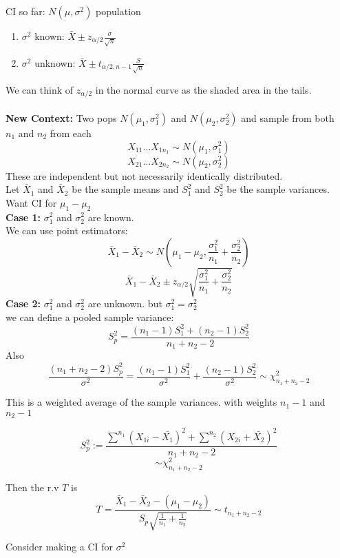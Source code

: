 \documentclass[answers,12pt,addpoints]{exam}
\begin{document}
\newpage
CI so far: 
$N(\mu, \sigma^2)$ population
\begin{enumerate}
    \item $\sigma^2$ known: $\bar{X} \pm z_{\alpha/2} \frac{\sigma}{\sqrt{n}}$
    \item $\sigma^2$ unknown: $\bar{X} \pm t_{\alpha/2, n-1} \frac{S}{\sqrt{n}}$
\end{enumerate}
We can think of $z_{\alpha/2}$ in the normal curve as the shaded area in the tails.\\\\
\textbf{New Context:}
Two pops $N(\mu_1, \sigma_1^2)$ and $N(\mu_2, \sigma_2^2)$ and sample from both \\
$n_1$ and $n_2$ from each
$$X_{11} \ldots X_{1n_1} \sim N(\mu_1, \sigma_1^2)$$
$$X_{21} \ldots X_{2n_2} \sim N(\mu_2, \sigma_2^2)$$
These are independent but not necessarily identically distributed.\\
Let $\bar{X}_1$ and $\bar{X}_2$ be the sample means and $S_1^2$ and $S_2^2$ be the sample variances.\\
Want CI for $\mu_1 - \mu_2$\\
\textbf{Case 1: } $\sigma_1^2$ and $\sigma_2^2$ are known.\\
We can use point estimators:
$$\bar{X}_1 - \bar{X}_2 \sim N(\mu_1 - \mu_2 , \frac{\sigma_1^2}{n_1} + \frac{\sigma_2^2}{n_2})$$
$$\bar{X}_1 - \bar{X}_2 \pm z_{\alpha/2} \sqrt{\frac{\sigma_1^2}{n_1} + \frac{\sigma_2^2}{n_2}}$$
\textbf{Case 2: } $\sigma_1^2$ and $\sigma_2^2$ are unknown. but $\sigma_1^2 = \sigma_2^2$\\
we can define a pooled sample variance:
$$S_p^2 = \frac{(n_1 - 1)S_1^2 + (n_2 - 1)S_2^2}{n_1 + n_2 - 2}$$
Also 
$$ \frac{(n_1 + n_2 - 2) S_p^2}{\sigma^2} = \frac{(n_1 - 1)S_1^2}{\sigma^2} + \frac{(n_2 - 1)S_2^2}{\sigma^2} \sim \chi^2_{n_1 + n_2 -2}$$
\begin{remark}
    This is a weighted average of the sample variances. with weights $n_1 - 1$ and $n_2 - 1$
\end{remark}
\begin{remark}
    $$S_p^2 := \frac{\sum^{n_1} (X_{1i} - \bar{X_1})^2 + \sum^{n_2}( X_{2i} + \bar{X_2} )^2}{n_1 + n_2 - 2}$$
    $$ \sim \chi^2_{n_1 + n_2 - 2}$$
\end{remark}
\begin{remark}
    Then the r.v $T$ is 
    $$T = \frac{\bar{X}_1 - \bar{X}_2 - (\mu_1 - \mu_2)}{S_p \sqrt{\frac{1}{n_1} + \frac{1}{n_2}}} \sim t_{n_1 + n_2 - 2}$$
\end{remark}
Consider making a CI for $\sigma^2$\\
\end{document}
